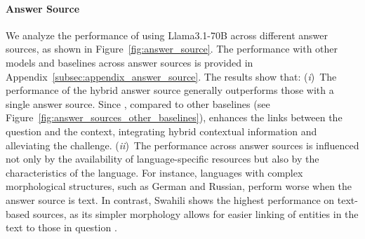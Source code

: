 \paragraph{Answer Source}
We analyze the performance of \ourmethod using Llama3.1-70B across different answer sources, as shown in Figure~\ref{fig:answer_source}. 
The performance with other models and baselines across answer sources is provided in Appendix~\ref{subsec:appendix_answer_source}. 
The results show that:
(\emph{i})~The performance of the hybrid answer source generally outperforms those with a single answer source. 
Since \ourmethod, compared to other baselines (see Figure~\ref{fig:answer_sources_other_baselines}), enhances the links between the question and the context, integrating hybrid contextual information and alleviating the challenge.
(\emph{ii})~The performance across answer sources is influenced not only by the availability of language-specific resources but also by the characteristics of the language.
For instance, languages with complex morphological structures, such as German and Russian, perform worse when the answer source is text. 
In contrast, Swahili shows the highest performance on text-based sources, as its simpler morphology allows for easier linking of entities in the text to those in question \cite{tuan-nguyen-etal-2020-Vietnamese,zhang-etal-2023-xsemplr}.

%     


